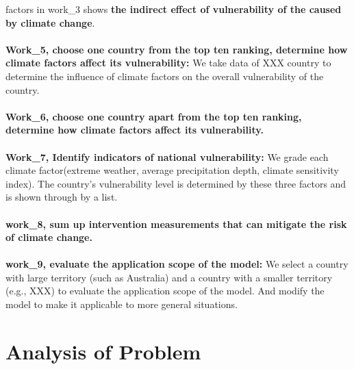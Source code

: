 \documentclass{mcmthesis}
\begin{document}
  factors in work\_3 shows \textbf{the indirect effect of vulnerability of the caused by 
  climate change}.\\\\
  \textbf{Work\_5, choose one country from the top ten ranking, determine how climate 
  factors affect its vulnerability:} We take data of XXX country to determine the 
  influence of climate factors on the overall vulnerability of the country.\\\\ 
  \textbf{Work\_6, choose one country apart from the top ten ranking, determine how 
  climate factors affect its vulnerability.}\\\\
  \textbf{Work\_7, Identify indicators of national vulnerability:} We grade each 
  climate factor(extreme weather, average precipitation depth, climate 
  sensitivity index). The country's vulnerability level is determined 
  by these three factors and is shown through by a list.\\\\
  \textbf{work\_8, sum up intervention measurements that can mitigate the risk of climate change.}\\\\
  \textbf{work\_9, evaluate the application scope of the model:} We select a country with large 
  territory (such as Australia) and a country with a smaller territory (e.g., 
  XXX) to evaluate the application scope of the model. And modify the model 
  to make it applicable to more general situations.
\section{Analysis of Problem}
\end{document}
